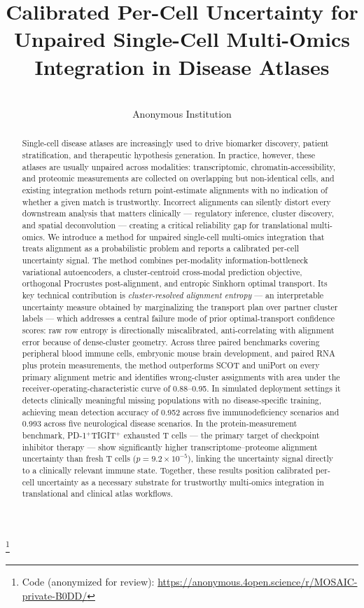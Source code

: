 \documentclass[pmlr]{jmlr}
\title[Calibrated Uncertainty for Unpaired Multi-Omics Integration]{%
Calibrated Per-Cell Uncertainty for\\ Unpaired Single-Cell Multi-Omics Integration in Disease Atlases}
\author{\Name{Anonymous Author(s)}
       \Email{anonymous@anonymous.edu}\\
       \addr Anonymous Institution}
\newcommand\blfootnote[1]{%
  \begingroup
  \renewcommand\thefootnote{}\footnote{#1}%
  \addtocounter{footnote}{-1}%
  \endgroup
}
\begin{document}
\maketitle

\blfootnote{Code (anonymized for review): \url{https://anonymous.4open.science/r/MOSAIC-private-B0DD/}}

\begin{abstract}
Single-cell disease atlases are increasingly used to drive biomarker discovery, patient stratification, and therapeutic hypothesis generation. In practice, however, these atlases are usually unpaired across modalities: transcriptomic, chromatin-accessibility, and proteomic measurements are collected on overlapping but non-identical cells, and existing integration methods return point-estimate alignments with no indication of whether a given match is trustworthy. Incorrect alignments can silently distort every downstream analysis that matters clinically --- regulatory inference, cluster discovery, and spatial deconvolution --- creating a critical reliability gap for translational multi-omics. We introduce a method for unpaired single-cell multi-omics integration that treats alignment as a probabilistic problem and reports a calibrated per-cell uncertainty signal. The method combines per-modality information-bottleneck variational autoencoders, a cluster-centroid cross-modal prediction objective, orthogonal Procrustes post-alignment, and entropic Sinkhorn optimal transport. Its key technical contribution is \emph{cluster-resolved alignment entropy} --- an interpretable uncertainty measure obtained by marginalizing the transport plan over partner cluster labels --- which addresses a central failure mode of prior optimal-transport confidence scores: raw row entropy is directionally miscalibrated, anti-correlating with alignment error because of dense-cluster geometry. Across three paired benchmarks covering peripheral blood immune cells, embryonic mouse brain development, and paired RNA plus protein measurements, the method outperforms SCOT and uniPort on every primary alignment metric and identifies wrong-cluster assignments with area under the receiver-operating-characteristic curve of 0.88--0.95. In simulated deployment settings it detects clinically meaningful missing populations with no disease-specific training, achieving mean detection accuracy of 0.952 across five immunodeficiency scenarios and 0.993 across five neurological disease scenarios. In the protein-measurement benchmark, PD-1$^+$TIGIT$^+$ exhausted T cells --- the primary target of checkpoint inhibitor therapy --- show significantly higher transcriptome--proteome alignment uncertainty than fresh T cells ($p = 9.2 \times 10^{-5}$), linking the uncertainty signal directly to a clinically relevant immune state. Together, these results position calibrated per-cell uncertainty as a necessary substrate for trustworthy multi-omics integration in translational and clinical atlas workflows.
\end{abstract}
\end{document}
